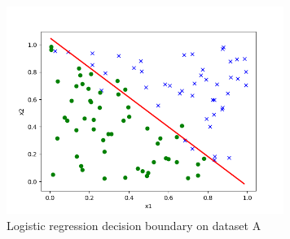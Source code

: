 \begin{answer}
\begin{figure}[H]
    \centering
    \includegraphics[width=9cm]{logreg_stability/logreg_pred_a.png}
    \caption*{Logistic regression decision boundary on dataset A}
\end{figure}
\end{answer}
